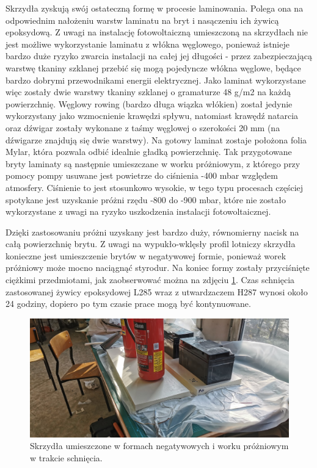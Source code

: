 \documentclass[12pt, a4paper]{article}
\begin{document}
Skrzydła zyskują swój ostateczną formę w procesie laminowania. Polega ona na odpowiednim nałożeniu warstw laminatu na bryt i nasączeniu ich żywicą epoksydową. Z uwagi na instalację fotowoltaiczną umieszczoną na skrzydłach nie jest możliwe wykorzystanie laminatu z włókna węglowego, ponieważ istnieje bardzo duże ryzyko zwarcia instalacji na całej jej długości - przez zabezpieczającą warstwę tkaniny szklanej przebić się mogą pojedyncze włókna węglowe, będące bardzo dobrymi przewodnikami energii elektrycznej. Jako laminat wykorzystane więc zostały dwie warstwy tkaniny szklanej o gramaturze 48 g/m2 na każdą powierzchnię. Węglowy rowing (bardzo długa wiązka włókien) został jedynie wykorzystany jako wzmocnienie krawędzi spływu, natomiast krawędź natarcia oraz dźwigar zostały wykonane z taśmy węglowej o szerokości 20 mm (na dźwigarze znajdują się dwie warstwy). Na gotowy laminat zostaje położona folia Mylar, która pozwala odbić idealnie gładką powierzchnię. Tak przygotowane bryty laminaty są następnie umieszczane w worku próżniowym, z którego przy pomocy pompy usuwane jest powietrze do ciśnienia -400 mbar względem atmosfery. Ciśnienie to jest stosunkowo wysokie, w tego typu procesach częściej spotykane jest uzyskanie próżni rzędu -800 do -900 mbar, które nie zostało wykorzystane z uwagi na ryzyko uszkodzenia instalacji fotowoltaicznej.

Dzięki zastosowaniu próżni uzyskany jest bardzo duży, równomierny nacisk na całą powierzchnię brytu. Z uwagi na wypukło-wklęsły profil lotniczy skrzydła konieczne jest umieszczenie brytów w negatywowej formie, ponieważ worek próżniowy może mocno naciągnąć styrodur. Na koniec formy zostały przyciśnięte ciężkimi przedmiotami, jak zaobserwować można na zdjęciu \ref{fig:schniecie}. Czas schnięcia zastosowanej żywicy epoksydowej L285 wraz z utwardzaczem H287 wynosi około 24 godziny, dopiero po tym czasie prace mogą być kontynuowane.

 \begin{figure}[ht]
    \centering
    \includegraphics[width=1\textwidth]{budowa9}
    \caption{Skrzydła umieszczone w formach negatywowych i worku próżniowym w trakcie schnięcia.}
    \label{fig:schniecie}
\end{figure}
\end{document}
